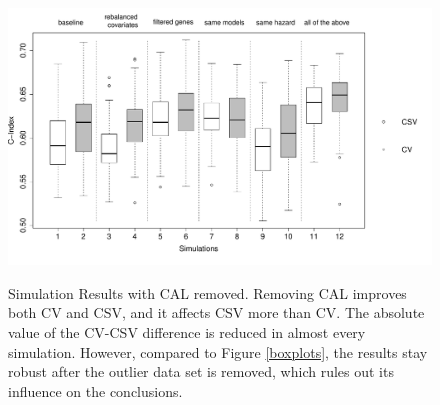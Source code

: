 \documentclass{article}
\begin{document}
  \begin{figure}[H]
  	\centering
  	\includegraphics[width=14cm]{rmCAL_boxplot_breast_masomenos_withnames.pdf}\\
  	\caption{Simulation Results with CAL removed. Removing CAL improves both CV and CSV, and it affects CSV more than CV. The absolute value of the CV-CSV difference is reduced in almost every simulation. However, compared to Figure \ref{boxplots}, the results stay robust after the outlier data set is removed, which rules out its influence on the conclusions.}
  	\label{boxplots-outlier}
  \end{figure}
  
\end{document}

